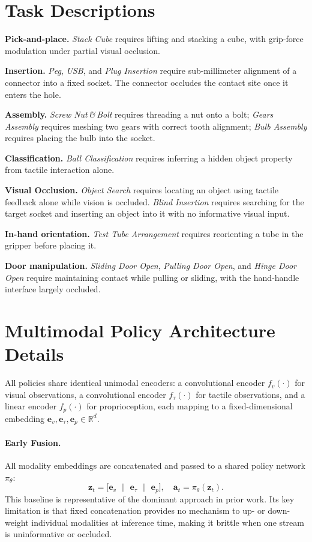 \documentclass{article}
\begin{document}
\section{Task Descriptions}
\label{app:tasks}
 
\textbf{Pick-and-place.} \emph{Stack Cube} requires lifting and stacking a cube, with grip-force modulation under partial visual occlusion.
 
\textbf{Insertion.} \emph{Peg}, \emph{USB}, and \emph{Plug Insertion} require sub-millimeter alignment of a connector into a fixed socket. The connector occludes the contact site once it enters the hole.
 
\textbf{Assembly.} \emph{Screw Nut\,\&\,Bolt} requires threading a nut onto a bolt; \emph{Gears Assembly} requires meshing two gears with correct tooth alignment; \emph{Bulb Assembly} requires placing the bulb into the socket.
 
\textbf{Classification.} \emph{Ball Classification} requires inferring a hidden object property from tactile interaction alone.
 
\textbf{Visual Occlusion.} \emph{Object Search} requires locating an object using tactile feedback alone while vision is occluded. \emph{Blind Insertion} requires searching for the target socket and inserting an object into it with no informative visual input.
 
\textbf{In-hand orientation.} \emph{Test Tube Arrangement} requires reorienting a tube in the gripper before placing it.
 
\textbf{Door manipulation.} \emph{Sliding Door Open}, \emph{Pulling Door Open}, and \emph{Hinge Door Open} require maintaining contact while pulling or sliding, with the hand-handle interface largely occluded.


\section{Multimodal Policy Architecture Details}
\label{app:policy-architectures}
 
All policies share identical unimodal encoders: a convolutional encoder $f_v(\cdot)$ for visual observations, a convolutional encoder $f_\tau(\cdot)$ for tactile observations, and a linear encoder $f_p(\cdot)$ for proprioception, each mapping to a fixed-dimensional embedding $\mathbf{e}_v, \mathbf{e}_\tau, \mathbf{e}_p \in \mathbb{R}^{d}$.
 
\paragraph{Early Fusion.}
All modality embeddings are concatenated and passed to a shared policy network $\pi_\theta$:
\begin{equation}
    \mathbf{z}_t = \bigl[\mathbf{e}_v \;\|\; \mathbf{e}_\tau \;\|\;
    \mathbf{e}_p\bigr], \quad \mathbf{a}_t = \pi_\theta(\mathbf{z}_t).
\end{equation}
This baseline is representative of the dominant approach in prior work. Its key limitation is that fixed concatenation provides no mechanism to up- or down-weight individual modalities at inference time, making it brittle when one stream is uninformative or occluded.
 
\end{document}
